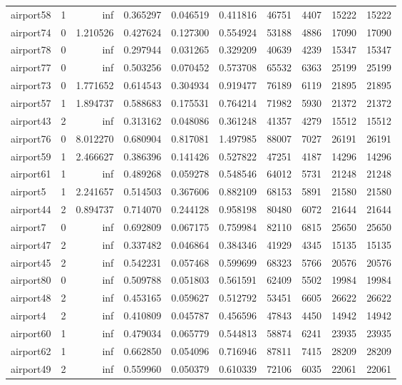 \begin{longtable}{|l|r|r|r|r|r|r|r|r|r|}
airport58 & 1 & inf & 0.365297 & 0.046519 & 0.411816 & 46751 & 4407 & 15222 & 15222 \\
airport74 & 0 & 1.210526 & 0.427624 & 0.127300 & 0.554924 & 53188 & 4886 & 17090 & 17090 \\
airport78 & 0 & inf & 0.297944 & 0.031265 & 0.329209 & 40639 & 4239 & 15347 & 15347 \\
airport77 & 0 & inf & 0.503256 & 0.070452 & 0.573708 & 65532 & 6363 & 25199 & 25199 \\
airport73 & 0 & 1.771652 & 0.614543 & 0.304934 & 0.919477 & 76189 & 6119 & 21895 & 21895 \\
airport57 & 1 & 1.894737 & 0.588683 & 0.175531 & 0.764214 & 71982 & 5930 & 21372 & 21372 \\
airport43 & 2 & inf & 0.313162 & 0.048086 & 0.361248 & 41357 & 4279 & 15512 & 15512 \\
airport76 & 0 & 8.012270 & 0.680904 & 0.817081 & 1.497985 & 88007 & 7027 & 26191 & 26191 \\
airport59 & 1 & 2.466627 & 0.386396 & 0.141426 & 0.527822 & 47251 & 4187 & 14296 & 14296 \\
airport61 & 1 & inf & 0.489268 & 0.059278 & 0.548546 & 64012 & 5731 & 21248 & 21248 \\
airport5 & 1 & 2.241657 & 0.514503 & 0.367606 & 0.882109 & 68153 & 5891 & 21580 & 21580 \\
airport44 & 2 & 0.894737 & 0.714070 & 0.244128 & 0.958198 & 80480 & 6072 & 21644 & 21644 \\
airport7 & 0 & inf & 0.692809 & 0.067175 & 0.759984 & 82110 & 6815 & 25650 & 25650 \\
airport47 & 2 & inf & 0.337482 & 0.046864 & 0.384346 & 41929 & 4345 & 15135 & 15135 \\
airport45 & 2 & inf & 0.542231 & 0.057468 & 0.599699 & 68323 & 5766 & 20576 & 20576 \\
airport80 & 0 & inf & 0.509788 & 0.051803 & 0.561591 & 62409 & 5502 & 19984 & 19984 \\
airport48 & 2 & inf & 0.453165 & 0.059627 & 0.512792 & 53451 & 6605 & 26622 & 26622 \\
airport4 & 2 & inf & 0.410809 & 0.045787 & 0.456596 & 47843 & 4450 & 14942 & 14942 \\
airport60 & 1 & inf & 0.479034 & 0.065779 & 0.544813 & 58874 & 6241 & 23935 & 23935 \\
airport62 & 1 & inf & 0.662850 & 0.054096 & 0.716946 & 87811 & 7415 & 28209 & 28209 \\
airport49 & 2 & inf & 0.559960 & 0.050379 & 0.610339 & 72106 & 6035 & 22061 & 22061 \\

\end{longtable}
